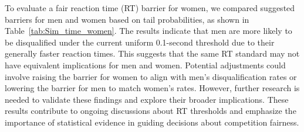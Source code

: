 \documentclass[12pt, letterpaper]{article}
\begin{document}
To evaluate a fair reaction time (RT) barrier for women, we compared suggested 
barriers for men and women based on tail probabilities, as shown in 
Table~\ref{tab:Sim_time_women}. The results indicate that men are more likely 
to be disqualified under the current uniform 0.1-second threshold due to their 
generally faster reaction times. This suggests that the same RT standard may not 
have equivalent implications for men and women. Potential adjustments could 
involve raising the barrier for women to align with men’s disqualification rates 
or lowering the barrier for men to match women’s rates. However, further research 
is needed to validate these findings and explore their broader implications. These 
results contribute to ongoing discussions about RT thresholds and emphasize the 
importance of statistical evidence in guiding decisions about competition fairness.




\end{document}
